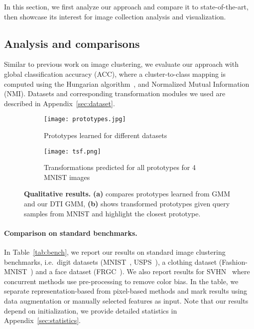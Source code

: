 \documentclass{article}
\newcommand{\tsfblue}[1]{\textcolor{tsfblue}{#1}}
\newcommand{\tsfgreen}[1]{\textcolor{tsfgreen}{#1}}
\begin{document}
In this section, we first analyze our approach and compare it to state-of-the-art, then 
showcase its interest for image collection analysis and visualization. 

\subsection{Analysis and comparisons}

Similar to previous work on image clustering, we evaluate our approach with global 
classification accuracy (ACC), where a cluster-to-class mapping is computed using the 
Hungarian algorithm~\cite{kuhnHungarianMethodAssignment1955}, and Normalized Mutual 
Information (NMI). Datasets and corresponding transformation modules we used are described in 
Appendix~\ref{sec:dataset}.\begin{figure}
    \centering
    \begin{subfigure}{\columnwidth}
      \centering
      \texttt{[image: prototypes.jpg]}
      \caption{Prototypes learned for different datasets}
    \label{fig:cluster_centers}
    \end{subfigure}
    \begin{subfigure}{\columnwidth}
      \centering
      \vspace{0.1em}
      \texttt{[image: tsf.png]}
      \caption{Transformations predicted for all prototypes for 4 MNIST images}
    \label{fig:transformations}
    \end{subfigure}
    \caption{\textbf{Qualitative results.} \textbf{(a)} compares prototypes learned from GMM 
    and our DTI GMM, \textbf{(b)} shows transformed prototypes given \tsfblue{query samples} 
  from MNIST and highlight the \tsfgreen{closest prototype}.}
  \label{fig:qualitative_results}
  \vspace{-1.5em}
\end{figure}

\vspace{-0.7em}
\paragraph{Comparison on standard benchmarks.}
In Table~\ref{tab:bench}, we report our results on standard image clustering benchmarks, 
i.e.\  digit datasets (MNIST~\cite{lecunGradientBasedLearningApplied1998}, 
USPS~\cite{hastie01statisticallearning}), a clothing dataset 
(Fashion-MNIST~\cite{xiao2017fashion}) and a face dataset (FRGC~\cite{FRGC}). We also
report results for SVHN~\cite{netzer2011reading} where concurrent methods use pre-processing 
to remove color bias. In the table, we separate representation-based from pixel-based methods 
and mark results using data augmentation or manually selected features as input. Note that 
our results depend on initialization, we provide detailed statistics in 
Appendix~\ref{sec:statistics}.
\end{document}
